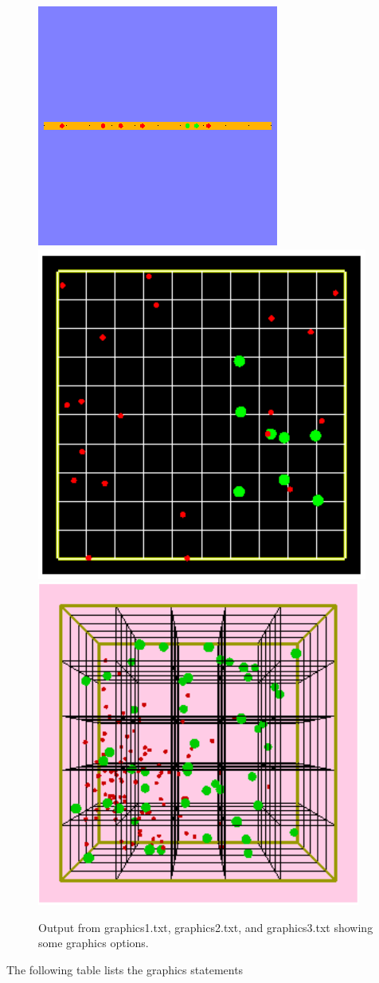 \documentclass {scrbook}
\begin{document}
\begin{figure}[h]
\centering
\includegraphics[height=5 cm]{figures/image16.png}
\includegraphics[height=5 cm]{figures/image17.png}
\includegraphics[height=5 cm]{figures/image18.png}
\caption{Output from graphics1.txt, graphics2.txt, and graphics3.txt showing some graphics options.}
\label{fig:graphics1}
\end{figure}

The following table lists the graphics statements
\end{document}
